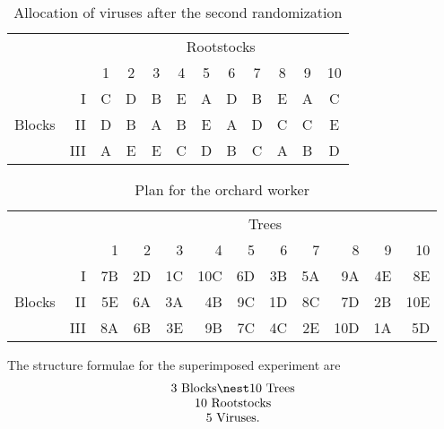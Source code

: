\begin{table}[htbp]
\begin{center}\begin{tabular}{lr|*{10}{c}}
 &  & \multicolumn{10}{c}{Rootstocks} \\
       &     & 1 & 2 & 3 & 4 & 5 & 6 & 7 & 8 & 9 & 10 \\
\hline
       &   I & C & D & B & E & A & D & B & E & A & C\\
Blocks &  II & D & B & A & B & E & A & D & C & C & E\\
       & III & A & E & E & C & D & B & C & A & B & D
\end{tabular}\end{center}
\caption{Allocation of viruses after the second randomization}
\label{t:virus}
\end{table}

\begin{table}[htbp]
\begin{center}\begin{tabular}{lr|*{10}r}
 &  & \multicolumn{10}{c}{Trees} \\
       &     & 1 & 2 & 3 & 4 & 5 & 6 & 7 & 8 & 9 & 10 \\
\hline
       &   I & 7B & 2D & 1C & 10C & 6D & 3B & 5A & 9A & 4E & 8E\\
Blocks &  II & 5E & 6A & 3A & 4B & 9C & 1D & 8C & 7D & 2B & 10E\\
       & III & 8A & 6B & 3E & 9B & 7C & 4C & 2E & 10D & 1A & 5D
\end{tabular}\end{center}
\caption{Plan for the orchard worker}
\label{t:orchard}
\end{table}

The structure formulae for the superimposed experiment are 
\[\begin{array}{c}
  \mbox{3 Blocks} \nest \mbox{10 Trees} \\
  \mbox{10 Rootstocks}  \\
  \mbox{5 Viruses}.
\end{array}\]

